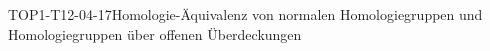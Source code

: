 
\begin{PROP}{TOP1-T12-04-17}{Homologie-Äquivalenz von normalen Homologiegruppen und Homologiegruppen über offenen Überdeckungen}
\end{PROP}
